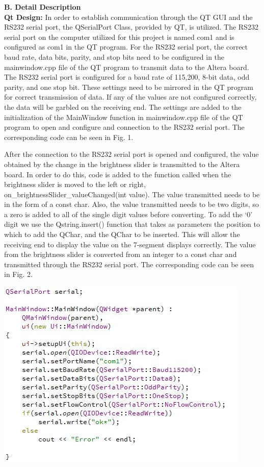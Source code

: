 \documentclass{article}
\newenvironment{Figure}
  {\par\medskip\noindent\ignorespaces\minipage{\linewidth}}
  {\endminipage\par\medskip}
\begin{document}
\begin{multicols*}{2}
{\bf B. Detail Description}\\
{\bf Qt Design:} 
In order to establish communication through the QT GUI and the RS232 serial port, the QSerialPort Class, provided by QT, is utilized. The RS232 serial port on the computer utilized for this project is named com1 and is configured as com1 in the QT program. For the RS232 serial port, the correct baud rate, data bits, parity, and stop bits need to be configured in the mainwindow.cpp file of the QT program to transmit data to the Altera board. The RS232 serial port is configured for a baud rate of 115,200, 8-bit data, odd parity, and one stop bit. These settings need to be mirrored in the QT program for correct transmission of data. If any of the values are not configured correctly, the data will be garbled on the receiving end. The settings are added to the initialization of the MainWindow function in mainwindow.cpp file of the QT program to open and configure and connection to the RS232 serial port. The corresponding code can be seen in Fig. 1.



After the connection to the RS232 serial port is opened and configured, the value obtained by the change in the brightness slider is transmitted to the Altera board. In order to do this, code is added to the function called when the brightness slider is moved to the left or right, on\_brightnessSlider\_valueChanged(int value). The value transmitted needs to be in the form of a const char. Also, the value transmitted needs to be two digits, so a zero is added to all of the single digit values before converting. To add the ‘0’ digit we use the Qstring.insert() function that takes as parameters the position to which to add the QChar, and the QChar to be inserted. This will allow the receiving end to display the value on the 7-segment displays correctly. The value from the brightness slider is converted from an integer to a const char and transmitted through the RS232 serial port. The corresponding code can be seen in Fig. 2. \\


\begin{Figure}
 \centering
 \includegraphics[width=\linewidth,height=5 cm]{mainwindowfunction.JPG}
\end{Figure}


\end{multicols*}
\end{document}
